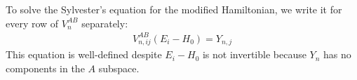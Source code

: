 To solve the Sylvester's equation for the modified Hamiltonian, we write it for
every row of $V_n^{AB}$ separately:
%
\begin{align}
V_{n, ij}^{AB} (E_i - H_0) = Y_{n, j}
\end{align}
%
This equation is well-defined despite $E_i - H_0$ is not invertible because
$Y_{n}$ has no components in the $A$ subspace.
